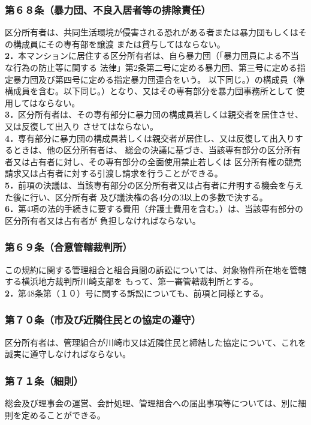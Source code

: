 \documentclass[12pt,uplatex,dvipdfmx]{jsarticle}
\begin{document}
\subsubsection*{第６８条（暴力団、不良入居者等の排除責任）}
区分所有者は、共同生活環境が侵害される恐れがある者または暴力団もしくはその構成員にその専有部を譲渡
または貸与してはならない。\\
\textbf{2．}本マンションに居住する区分所有者は、自ら暴力団（「暴力団員による不当な行為の防止等に関する
法律」第2条第二号に定める暴力団、第三号に定める指定暴力団及び第四号に定める指定暴力団連合をいう。
以下同じ。）の構成員（準構成員を含む。以下同じ。）となり、又はその専有部分を暴力団事務所として
使用してはならない。\\
\textbf{3．}区分所有者は、その専有部分に暴力団の構成員若しくは親交者を居住させ、又は反復して出入り
させてはならない。\\
\textbf{4．}専有部分に暴力団の構成員若しくは親交者が居住し、又は反復して出入りするときは、他の区分所有者は、
総会の決議に基づき、当該専有部分の区分所有者又は占有者に対し、その専有部分の全面使用禁止若しくは
区分所有権の競売請求又は占有者に対する引渡し請求を行うことができる。\\
\textbf{5．}前項の決議は、当該専有部分の区分所有者又は占有者に弁明する機会を与えた後に行い、区分所有者
及び議決権の各4分の3以上の多数で決する。\\
\textbf{6．}第4項の法的手続きに要する費用（弁護士費用を含む。）は、当該専有部分の区分所有者又は占有者が
負担しなければならない。
\subsubsection*{第６９条（合意管轄裁判所）}
この規約に関する管理組合と組合員間の訴訟については、対象物件所在地を管轄する横浜地方裁判所川崎支部を
もって、第一審管轄裁判所とする。\\
\textbf{2．}第48条第（１０）号に関する訴訟についても、前項と同様とする。
\subsubsection*{第７０条（市及び近隣住民との協定の遵守）}
区分所有者は、管理組合が川崎市又は近隣住民と締結した協定について、これを誠実に遵守しなければならない。
\subsubsection*{第７１条（細則）}
総会及び理事会の運営、会計処理、管理組合への届出事項等については、別に細則を定めることができる。
\end{document}
